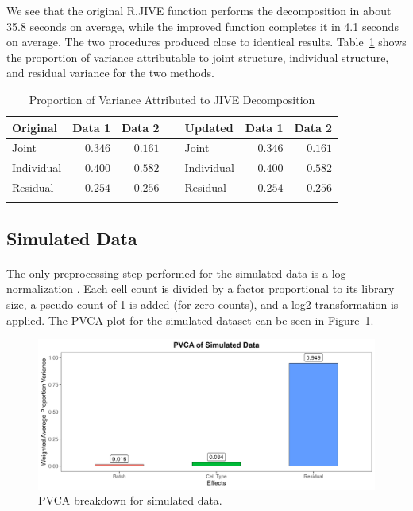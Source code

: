 \documentclass[unnumsec,webpdf,contemporary,large]{oup-authoring-template}%
\theoremstyle{thmstyleone}%
\theoremstyle{thmstyletwo}%
\theoremstyle{thmstylethree}%
\begin{document}
We see that the original R.JIVE function performs the decomposition in about 35.8 seconds on average, while the improved function completes it in 4.1 seconds on average. The two procedures produced close to identical results. Table~\ref{tab:simdata2_variance} shows the proportion of variance attributable to joint structure, individual structure, and residual variance for the two methods.

\begin{table}[ht]
    \caption{Proportion of Variance Attributed to JIVE Decomposition}
    \centering
    \begin{tabular}{lrrclrr}
        \toprule
        Original   & Data 1  & Data 2  & $\mid$ & Updated    & Data 1  & Data 2  \\
        \midrule
        Joint      & $0.346$ & $0.161$ & $\mid$ & Joint      & $0.346$ & $0.161$ \\
        Individual & $0.400$ & $0.582$ & $\mid$ & Individual & $0.400$ & $0.582$ \\
        Residual   & $0.254$ & $0.256$ & $\mid$ & Residual   & $0.254$ & $0.256$ \\
        \botrule
        \end{tabular}
    \label{tab:simdata2_variance}
\end{table}

\subsection{Simulated Data}

\paragraph*{}
The only preprocessing step performed for the simulated data is a log-normalization \citep{davis2017scater}. Each cell count is divided by a factor proportional to its library size, a pseudo-count of 1 is added (for zero counts), and a log2-transformation is applied. The PVCA plot for the simulated dataset can be seen in Figure~\ref{fig:pvca_simdata}.

\begin{figure}[ht]
    \centering 
    \includegraphics[width=1\columnwidth]{pvca_simdata} 
    \caption[PVCA Breakdown for Simulated Data]{PVCA breakdown for simulated data.}
    \label{fig:pvca_simdata} 
\end{figure}
\end{document}
